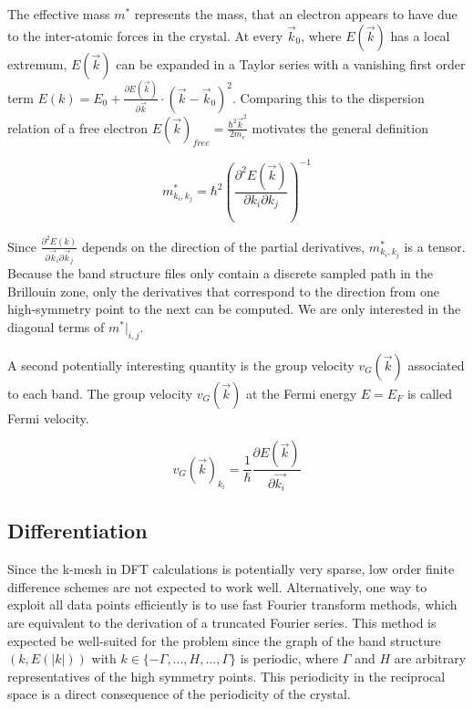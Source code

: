 The effective mass $m^{*}$ represents the mass, that an electron appears to have due to the inter-atomic forces in the crystal. At every $\vec{k}_0$, where $E(\vec{k})$ has a local extremum, $E(\vec{k})$ can be expanded in a Taylor series with a vanishing first order term $E(k) = E_0 + \frac{\partial E(\vec{k})}{\partial \vec{k}} \cdot (\vec{k}-\vec{k}_0)^2$. Comparing this to the dispersion relation of a free electron $E(\vec{k})_{free} = \frac{\hbar^2 \vec{k}^2}{2 m_e}$ motivates the general definition 

\begin{equation}
    m^{*}_{k_i,k_j} = \hbar^2  \left(\frac{\partial^2E(\vec{k})}{\partial k_i \partial k_j}\right)^{-1}
\end{equation}

Since $\frac{\partial^2E(k)}{\partial \vec{k}_i \partial \vec{k}_j}$ depends on the direction of the partial derivatives, $m^{*}_{k_i,k_j}$ is a tensor. Because the band structure files only contain a discrete sampled path in the Brillouin zone, only the derivatives that correspond to the direction from one high-symmetry point to the next can be computed. We are only interested in the diagonal terms of $m^{*}\big|_{i,j}$.



A second potentially interesting quantity is the group velocity $v_{G}(\vec{k})$ associated to each band. The group velocity $v_{G}(\vec{k})$ at the Fermi energy $E = E_F$ is called Fermi velocity.

\begin{equation}
    v_{G}(\vec{k})_{k_i} = \frac{1}{\hbar}\frac{\partial E(\vec{k})}{\partial \vec{k_i}}
\end{equation}


\subsection{Differentiation}

Since the k-mesh in DFT calculations is potentially very sparse, low order finite difference schemes are not expected to work well. Alternatively, one way to exploit all data points efficiently is to use fast Fourier transform methods, which are equivalent to the derivation of a truncated Fourier series. This method is expected be well-suited for the problem since the graph of the band structure $(k, E(|k|))$ with $k \in \{-\Gamma,..., H,..., \Gamma\}$ is periodic, where $\Gamma$ and $H$ are arbitrary representatives of the high symmetry points. This periodicity in the reciprocal space is a direct consequence of the periodicity of the crystal.

